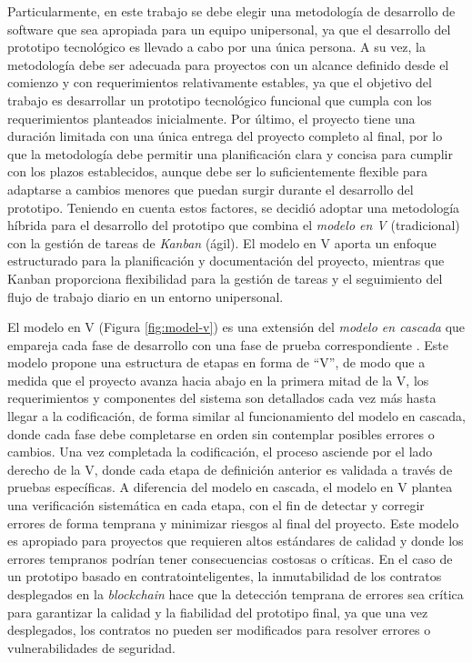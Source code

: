 Particularmente, en este trabajo se debe elegir una metodología de desarrollo de software que sea apropiada para un equipo unipersonal, ya que el desarrollo del prototipo tecnológico es llevado a cabo por una única persona. A su vez, la metodología debe ser adecuada para proyectos con un alcance definido desde el comienzo y con requerimientos relativamente estables, ya que el objetivo del trabajo es desarrollar un prototipo tecnológico funcional que cumpla con los requerimientos planteados inicialmente. Por último, el proyecto tiene una duración limitada con una única entrega del proyecto completo al final, por lo que la metodología debe permitir una planificación clara y concisa para cumplir con los plazos establecidos, aunque debe ser lo suficientemente flexible para adaptarse a cambios menores que puedan surgir durante el desarrollo del prototipo. Teniendo en cuenta estos factores, se decidió adoptar una metodología híbrida para el desarrollo del prototipo que combina el \textit{modelo en V} (tradicional) con la gestión de tareas de \textit{Kanban} (ágil). El modelo en V aporta un enfoque estructurado para la planificación y documentación del proyecto, mientras que Kanban proporciona flexibilidad para la gestión de tareas y el seguimiento del flujo de trabajo diario en un entorno unipersonal.

El modelo en V (Figura \ref{fig:model-v}) es una extensión del \textit{modelo en cascada} que empareja cada fase de desarrollo con una fase de prueba correspondiente \cite{pressman2010ingenieria}. Este modelo propone una estructura de etapas en forma de ``V'', de modo que a medida que el proyecto avanza hacia abajo en la primera mitad de la V, los requerimientos y componentes del sistema son detallados cada vez más hasta llegar a la codificación, de forma similar al funcionamiento del modelo en cascada, donde cada fase debe completarse en orden sin contemplar posibles errores o cambios. Una vez completada la codificación, el proceso asciende por el lado derecho de la V, donde cada etapa de definición anterior es validada a través de pruebas específicas. A diferencia del modelo en cascada, el modelo en V plantea una verificación sistemática en cada etapa, con el fin de detectar y corregir errores de forma temprana y minimizar riesgos al final del proyecto. Este modelo es apropiado para proyectos que requieren altos estándares de calidad y donde los errores tempranos podrían tener consecuencias costosas o críticas. En el caso de un prototipo basado en \glspl{contratointeligente}, la inmutabilidad de los contratos desplegados en la \textit{blockchain} hace que la detección temprana de errores sea crítica para garantizar la calidad y la fiabilidad del prototipo final, ya que una vez desplegados, los contratos no pueden ser modificados para resolver errores o vulnerabilidades de seguridad.

